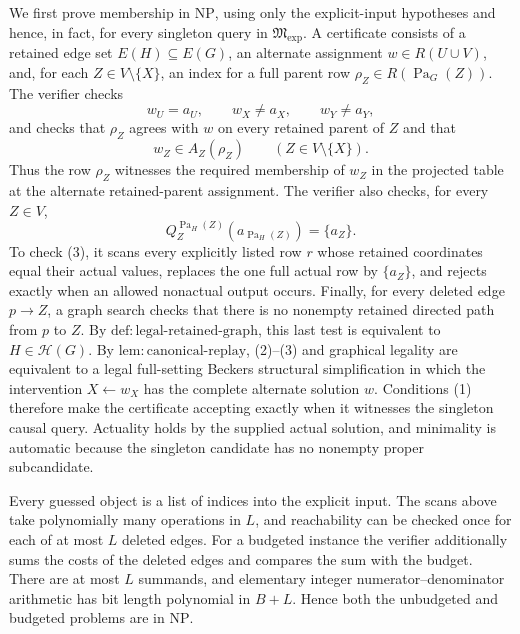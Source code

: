 We first prove membership in \(\mathrm{NP}\), using only the explicit-input hypotheses and hence, in fact, for every singleton query in \(\mathfrak M_{\mathrm{exp}}\).  A certificate consists of a retained edge set \(E(H)\subseteq E(G)\), an alternate assignment \(w\in R(U\cup V)\), and, for each \(Z\in V\setminus\{X\}\), an index for a full parent row \(\rho_Z\in R(\operatorname{Pa}_G(Z))\).  The verifier checks
\[
 w_U=a_U,\qquad w_X\ne a_X,\qquad w_Y\ne a_Y,                                      \tag{1}
\]
and checks that \(\rho_Z\) agrees with \(w\) on every retained parent of \(Z\) and that
\[
 w_Z\in A_Z(\rho_Z)\qquad (Z\in V\setminus\{X\}).                                  \tag{2}
\]
Thus the row \(\rho_Z\) witnesses the required membership of \(w_Z\) in the projected table at the alternate retained-parent assignment.  The verifier also checks, for every \(Z\in V\),
\[
 Q_Z^{\operatorname{Pa}_H(Z)}(a_{\operatorname{Pa}_H(Z)})=\{a_Z\}.                  \tag{3}
\]
To check (3), it scans every explicitly listed row \(r\) whose retained coordinates equal their actual values, replaces the one full actual row by \(\{a_Z\}\), and rejects exactly when an allowed nonactual output occurs.  Finally, for every deleted edge \(p\to Z\), a graph search checks that there is no nonempty retained directed path from \(p\) to \(Z\).  By \(\mathrm{def:legal\mbox{-}retained\mbox{-}graph}\), this last test is equivalent to \(H\in\mathcal H(G)\).  By \(\mathrm{lem:canonical\mbox{-}replay}\), (2)--(3) and graphical legality are equivalent to a legal full-setting Beckers structural simplification in which the intervention \(X\leftarrow w_X\) has the complete alternate solution \(w\).  Conditions (1) therefore make the certificate accepting exactly when it witnesses the singleton causal query.  Actuality holds by the supplied actual solution, and minimality is automatic because the singleton candidate has no nonempty proper subcandidate.

Every guessed object is a list of indices into the explicit input.  The scans above take polynomially many operations in \(L\), and reachability can be checked once for each of at most \(L\) deleted edges.  For a budgeted instance the verifier additionally sums the costs of the deleted edges and compares the sum with the budget.  There are at most \(L\) summands, and elementary integer numerator--denominator arithmetic has bit length polynomial in \(B+L\).  Hence both the unbudgeted and budgeted problems are in \(\mathrm{NP}\).


